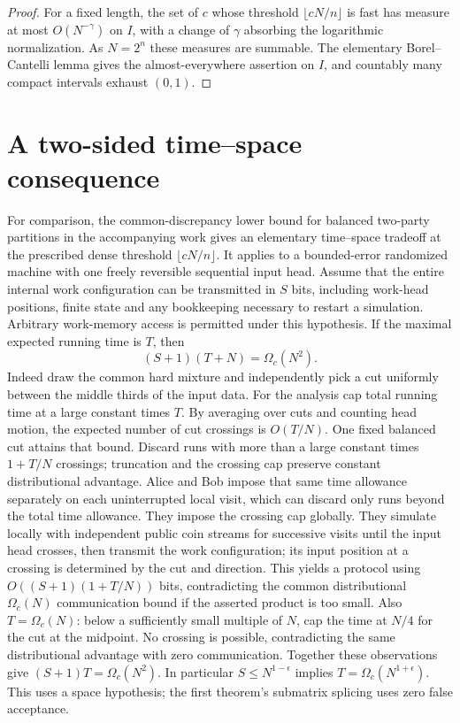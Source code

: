 \documentclass[11pt]{article}
\begin{document}
\begin{proof}
For a fixed length, the set of $c$ whose threshold $\lfloor cN/n\rfloor$ is fast has measure at most $O(N^{-\gamma})$ on $I$, with a change of $\gamma$ absorbing the logarithmic normalization. As $N=2^n$ these measures are summable. The elementary Borel--Cantelli lemma gives the almost-everywhere assertion on $I$, and countably many compact intervals exhaust $(0,1)$.
\end{proof}

\section{A two-sided time--space consequence}

For comparison, the common-discrepancy lower bound for balanced two-party partitions in the accompanying work \cite{companion} gives an elementary time--space tradeoff at the prescribed dense threshold $\lfloor cN/n\rfloor$. It applies to a bounded-error randomized machine with one freely reversible sequential input head. Assume that the entire internal work configuration can be transmitted in $S$ bits, including work-head positions, finite state and any bookkeeping necessary to restart a simulation. Arbitrary work-memory access is permitted under this hypothesis. If the maximal expected running time is $T$, then
\[
 (S+1)(T+N)=\Omega_c(N^2).
\]
Indeed draw the common hard mixture and independently pick a cut uniformly between the middle thirds of the input data. For the analysis cap total running time at a large constant times $T$. By averaging over cuts and counting head motion, the expected number of cut crossings is $O(T/N)$. One fixed balanced cut attains that bound. Discard runs with more than a large constant times $1+T/N$ crossings; truncation and the crossing cap preserve constant distributional advantage. Alice and Bob impose that same time allowance separately on each uninterrupted local visit, which can discard only runs beyond the total time allowance. They impose the crossing cap globally. They simulate locally with independent public coin streams for successive visits until the input head crosses, then transmit the work configuration; its input position at a crossing is determined by the cut and direction. This yields a protocol using $O((S+1)(1+T/N))$ bits, contradicting the common distributional $\Omega_c(N)$ communication bound if the asserted product is too small. Also $T=\Omega_c(N)$: below a sufficiently small multiple of $N$, cap the time at $N/4$ for the cut at the midpoint. No crossing is possible, contradicting the same distributional advantage with zero communication. Together these observations give $(S+1)T=\Omega_c(N^2)$. In particular $S\le N^{1-\epsilon}$ implies $T=\Omega_c(N^{1+\epsilon})$. This uses a space hypothesis; the first theorem's submatrix splicing uses zero false acceptance.
\end{document}

